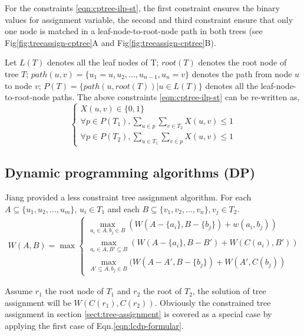 For the constraints \ref{eqn:cptree-ilp-st}, the first constraint ensures the binary values for assignment variable, the second and third constraint ensure that only one node is matched in a leaf-node-to-root-node path in both trees (see Fig\ref{fig:treeassign-cptree}A and Fig\ref{fig:treeassign-cptree}B). 

Let $L(T)$ denotes all the leaf nodes of T; $root(T)$ denotes the root node of tree $T$; $path(u,v) = \{u_1 = u,u_2, \ldots, u_{n-1}, u_n = v\}$ denotes the path from node $u$ to node $v$; $P(T) = \{path(u, root(T))|u \in L(T)\}$ denotes all the leaf-node-to-root-node paths. The above constraints \ref{eqn:cptree-ilp-st} can be re-written as,
\begin{equation}
\left\{
\begin{array}{l}
X(u,v) \in \{0,1\} \\
\forall p \in P(T_1), \sum_{u\in p}\sum_{v \in T_2} X(u,v) \le 1 \\
\forall p \in P(T_2), \sum_{u\in T_1}\sum_{v \in p} X(u,v) \le 1 
\end{array}
\right.
\end{equation}

\subsection{Dynamic programming algorithms (DP)}


Jiang \cite{Jiang:95} provided a less constraint tree assignment algorithm.
For each $A \subseteq \{u_1,u_2,...,u_m\}$, $u_i \in T_1$ and each $B \subseteq \{v_1,v_2,...,v_n\}, v_j \in T_2$. \\
\begin{eqnarray} \label{eqn:lcdp-formular}
W(A,B) = \max \begin{cases}
\max_{a_i \in A, b_j \in B}(W(A-\{a_i\}, B-\{b_j\}) + w(a_i,b_j))\\
\max_{a_i \in A, B' \subseteq B}(W(A-\{a_i\}, B-B') + W(C(a_i), B')) \\
\max_{A' \subseteq A, b_j \in B}(W(A-A', B-\{b_j\}) + W(A', C(b_j))
\end{cases} 
\end{eqnarray}

Assume $r_1$ the root node of $T_1$ and $r_2$ the root of $T_2$, the solution of tree assignment will be $W(C(r_1), C(r_2))$.
Obviously the constrained tree assignment in section \ref{sect:tree-assignment} is covered as a special case by applying the first case of Eqn.\eqref{eqn:lcdp-formular}. 

